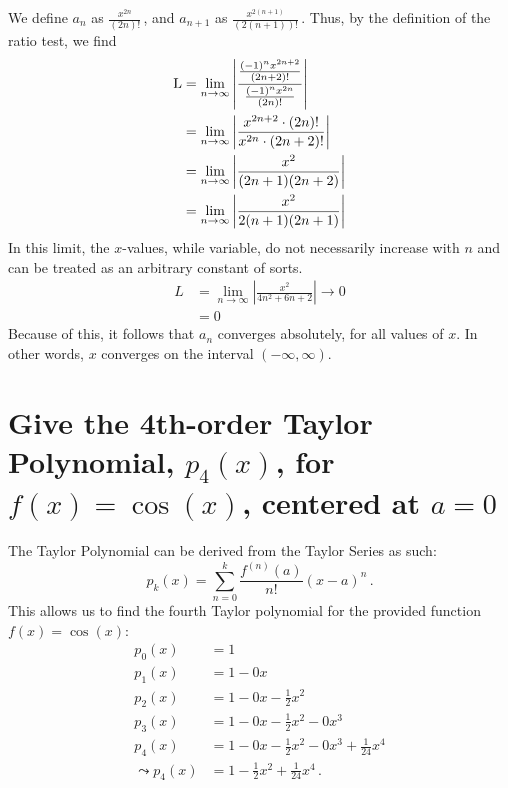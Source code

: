 \documentclass[12pt, letterpaper]{article}
\begin{document}
We define $a_n$ as $\frac{x^{2n}}{{(2n)}!}$\,, and $a_{n+1}$ as
$\frac{x^{2{(n+1)}}}{{(2{(n+1)})}!}$\,.
Thus, by the definition of the ratio test, we find
\begin{subequations}
\begin{align}
	\textup{L} &=
	\lim_{n\to\infty}
	\left|
	\frac
	{\frac{{(-1)}^{n}x^{2n+2}}{{(2n+2)}!}}
	{\frac{{(-1)}^{n}x^{2n}}{{(2n)}!}}
	\right|\\
	  &= \lim_{n\to\infty}
	\left|
	\frac
	{x^{2n+2}\cdot{(2n)}!}
	{x^{2n}\cdot{(2n+2)}!}
	\right|\\
	  &=
	   \lim_{n\to\infty}
	   \left|
	   \frac
	   {x^{2}}
	   {{(2n+1)}{(2n+2)}}
	   \right|\\
	  &=
	  \lim_{n\to\infty}
	  \left|
	  \frac{x^2}{2{(n+1)}{(2n+1)}}
	  \right|
\end{align}
\end{subequations}
In this limit, the $x$-values, while variable,
do not necessarily increase with $n$ and can be treated as an arbitrary
constant of sorts.
\begin{subequations}
\begin{align}
	L &= 
	\lim_{n\to\infty}
	\left|
	\frac{x^2}{4n^2+6n+2}
	\right|\to0\\
	  &= 0
\end{align}
\end{subequations}
Because of this, it follows that $a_n$ converges absolutely,
for all values of $x$.
In other words, $x$ converges on the interval ${(-\infty,\infty)}$.

\hfill\blacksquare%
\clearpage


\section{Give the 4th-order Taylor Polynomial, $p_{4}{(x)}$, for 
$f{(x)}=\cos{(x)}$, centered at $a=0$}

The Taylor Polynomial can be derived from the Taylor Series as such:
\begin{equation}
	p_{k}{(x)} = \sum_{n=0}^{k} \frac{f^{(n)}{(a)}}{n!}{(x-a)}^{n} \,.
\end{equation}
This allows us to find the fourth Taylor polynomial for the provided function
$f{(x)}=\cos{(x)}$:
\begin{subequations}
	\begin{align}
		p_{0}{(x)} &= 1\\
		p_{1}{(x)} &= 1 - 0x\\
		p_{2}{(x)} &= 1 - 0x - \frac{1}{2}x^{2}\\
		p_{3}{(x)} &= 1 - 0x - \frac{1}{2}x^{2} - 0x^{3}\\
		p_{4}{(x)} &= 1 - 0x - \frac{1}{2}x^{2} - 0x^{3} + \frac{1}{24}x^{4}\\
		\leadsto p_{4}{(x)} &= 1 - \frac{1}{2}x^{2} + \frac{1}{24}x^{4}\,.
	\end{align}
\end{subequations}
\hfill\blacksquare%
\end{document}
